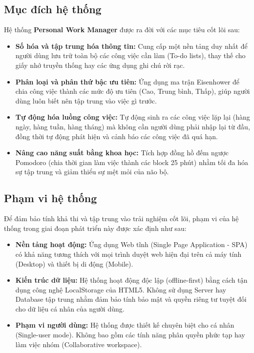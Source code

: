 \subsection{Mục đích hệ thống}
Hệ thống \textbf{Personal Work Manager} được ra đời với các mục tiêu cốt lõi sau:
\begin{itemize}
    \item \textbf{Số hóa và tập trung hóa thông tin:} Cung cấp một nền tảng duy nhất để người dùng lưu trữ toàn bộ các công việc cần làm (To-do lists), thay thế cho giấy nhớ truyền thống hay các ứng dụng ghi chú rời rạc.
    \item \textbf{Phân loại và phân thứ bậc ưu tiên:} Ứng dụng ma trận Eisenhower để chia công việc thành các mức độ ưu tiên (Cao, Trung bình, Thấp), giúp người dùng luôn biết nên tập trung vào việc gì trước.
    \item \textbf{Tự động hóa luồng công việc:} Tự động sinh ra các công việc lặp lại (hàng ngày, hàng tuần, hàng tháng) mà không cần người dùng phải nhập lại từ đầu, đồng thời tự động phát hiện và cảnh báo các công việc đã quá hạn.
    \item \textbf{Nâng cao năng suất bằng khoa học:} Tích hợp đồng hồ đếm ngược Pomodoro (chia thời gian làm việc thành các block 25 phút) nhằm tối đa hóa sự tập trung và giảm thiểu sự mệt mỏi của não bộ.
\end{itemize}

\subsection{Phạm vi hệ thống}
Để đảm bảo tính khả thi và tập trung vào trải nghiệm cốt lõi, phạm vi của hệ thống trong giai đoạn phát triển này được xác định như sau:
\begin{itemize}
    \item \textbf{Nền tảng hoạt động:} Ứng dụng Web tĩnh (Single Page Application - SPA) có khả năng tương thích với mọi trình duyệt web hiện đại trên cả máy tính (Desktop) và thiết bị di động (Mobile).
    \item \textbf{Kiến trúc dữ liệu:} Hệ thống hoạt động độc lập (offline-first) bằng cách tận dụng công nghệ LocalStorage của HTML5. Không sử dụng Server hay Database tập trung nhằm đảm bảo tính bảo mật và quyền riêng tư tuyệt đối cho dữ liệu cá nhân của người dùng.
    \item \textbf{Phạm vi người dùng:} Hệ thống được thiết kế chuyên biệt cho cá nhân (Single-user mode). Không bao gồm các tính năng phân quyền phức tạp hay làm việc nhóm (Collaborative workspace).
\end{itemize}

